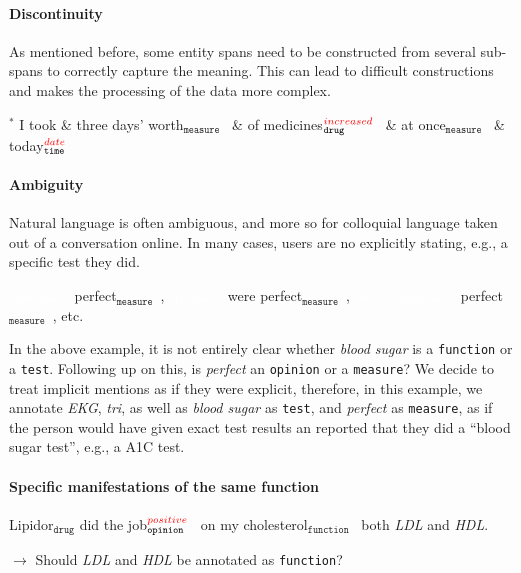 \documentclass[12pt]{article}
\theoremstyle{definition}
\newcommand{\drug}[1]{\colorbox{brass}{#1$_{\texttt{drug}}$}}
\newcommand{\drugInc}[1]{\colorbox{brass}{#1$_{\texttt{drug}}^{\textcolor{red}{increased}}$}\ }
\newcommand{\test}[1]{\colorbox{asparagus}{\textcolor{white}{#1}$_{\textcolor{white}{\texttt{test}}}$}\ }
\newcommand{\function}[1]{\colorbox{banana}{#1$_{\texttt{function}}$}\ }
\newcommand{\opPos}[1]{\colorbox{babyblue}{#1$_{\texttt{opinion}}^{\textcolor{red}{positive}}$}\ }
\newcommand{\measure}[1]{\colorbox{bittersweet}{#1$_{\texttt{measure}}$}\ }
\newcommand{\timexDate}[2]{\colorbox{ashgrey}{#1$_{\texttt{time}}^{\textcolor{red}{date}}$}\ }
\newcommand{\causedRel}[2]{\depedge[edge unit distance=0.8ex, label style={fill=yellow, font= \large}]{#1}{#2}{\texttt{caused}}}
\newcommand{\discontRel}[2]{\depedge[edge unit distance=0.5em, dashed]{#1}{#2}{\texttt{discont.}}}
\newcommand{\drawRelations}[2]{
    \begin{dependency}[theme=default]
        \begin{deptext}
            #1 \\   %
        \end{deptext}
        #2          %
    \end{dependency}
}
\newcommand{\translated}{$^{\ast}$\xspace}
\begin{document}
\paragraph{Discontinuity} As mentioned before, some entity spans need to be constructed from several sub-spans to correctly capture the meaning.
This can lead to difficult constructions and makes the processing of the data more complex. 

\begin{flushleft}
\drawRelations{\translated I took \& \measure{{three days' worth}} \& of \drugInc{medicines} \& \measure{at once} \& \timexDate{today}.}{
\discontRel{2}{4}
}
\end{flushleft}


\paragraph{Ambiguity} Natural language is often ambiguous, and more so for colloquial language taken out of a conversation online. 
In many cases, users are no explicitly stating, e.g., a specific test they did.

\begin{flushleft}
\test{EKG} \measure{perfect}, \test{tri's} were \measure{perfect}, \test{blood sugar} \measure{perfect}, etc.
\end{flushleft}
In the above example, it is not entirely clear whether \textit{blood sugar} is a \texttt{function} or a \texttt{test}. 
Following up on this, is \textit{perfect} an \texttt{opinion} or a \texttt{measure}?
We decide to treat implicit mentions as if they were explicit, therefore, in this example, we annotate \textit{EKG}, \textit{tri}, as well as \textit{blood sugar} as \texttt{test}, and \textit{perfect} as \texttt{measure}, as if the person would have given exact test results an reported that they did a ``blood sugar test'', e.g., a A1C test.
    

\paragraph{Specific manifestations of the same function} 

\begin{flushleft}
\drug{Lipidor} \opPos{did the job} on my \function{cholesterol} both \emph{LDL} and \emph{HDL}.
\end{flushleft}

$\rightarrow$ Should \textit{LDL} and \textit{HDL} be annotated as \texttt{function}?
\end{document}
